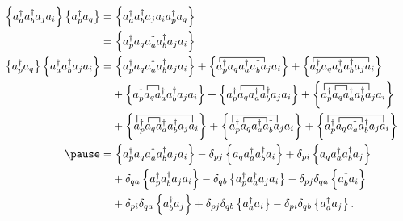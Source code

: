     \begin{align*}
        \normord{a^\dagger_a a^\dagger_b a_j a_i} \normord{a^\dagger_p a_q} &= 
            \normord{a^\dagger_a a^\dagger_b a_j a_i a^\dagger_p a_q} \\ 
        &= \normord{a^\dagger_p a_q a^\dagger_a a^\dagger_b a_j a_i} 
        \\
        \normord{a^\dagger_p a_q} \normord{a^\dagger_a a^\dagger_b a_j a_i} &= 
            \normord{a^\dagger_p a_q a^\dagger_a a^\dagger_b a_j a_i}
        + \left\{ 
        \contraction{}{a}{{}^\dagger_pa_q a^\dagger_a a^\dagger_b}{a}
        a^\dagger_p a_q a^\dagger_a a^\dagger_b a_j a_i\right\}
        + \left\{ 
        \contraction{}{a}{{}^\dagger_pa_q a^\dagger_a a^\dagger_b a_j}{a}
        a^\dagger_p a_q a^\dagger_a a^\dagger_b a_j a_i\right\} \\
        & \quad 
        + \left\{ 
        \contraction{a^\dagger_p}{a}{{}_q}{a}
        a^\dagger_p a_q a^\dagger_a a^\dagger_b a_j a_i\right\}
        + \left\{ 
        \contraction{a^\dagger_p}{a}{{}_q a^\dagger_a}{a}
        a^\dagger_p a_q a^\dagger_a a^\dagger_b a_j a_i\right\}
        + \left\{ 
        \contraction{a^\dagger_p}{a}{{}_q}{a}
        \contraction[1.5ex]{}{a}{{}^\dagger_pa_q a^\dagger_a a^\dagger_b}{a}
        a^\dagger_p a_q a^\dagger_a a^\dagger_b a_j a_i\right\} \\
        & \quad 
        + \left\{ 
        \contraction{a^\dagger_p}{a}{{}_q}{a}
        \contraction[1.5ex]{}{a}{{}^\dagger_pa_q a^\dagger_a a^\dagger_b a_j}{a}
        a^\dagger_p a_q a^\dagger_a a^\dagger_b a_j a_i\right\}
        + \left\{ 
        \contraction{a^\dagger_p}{a}{{}_q a^\dagger_a}{a}
        \contraction[1.5ex]{}{a}{{}^\dagger_pa_q a^\dagger_a a^\dagger_b}{a}
        a^\dagger_p a_q a^\dagger_a a^\dagger_b a_j a_i\right\}
        + \left\{ 
        \contraction{a^\dagger_p}{a}{{}_q a^\dagger_a}{a}
        \contraction[1.5ex]{}{a}{{}^\dagger_pa_q a^\dagger_a a^\dagger_b a_j}{a}
        a^\dagger_p a_q a^\dagger_a a^\dagger_b a_j a_i\right\} \\ \pause
        &= \normord{a^\dagger_p a_q a^\dagger_a a^\dagger_b a_j a_i}
        - \delta_{pj} \normord{a_q a^\dagger_a a^\dagger_b a_i}
        + \delta_{pi} \normord{a_q a^\dagger_a a^\dagger_b a_j} \\
        & \quad + \delta_{qa} \normord{a^\dagger_p a^\dagger_b a_j a_i}
        - \delta_{qb}\normord{a^\dagger_p a^\dagger_a a_j a_i} 
        - \delta_{pj} \delta_{qa} \normord{a^\dagger_b a_i} \\
        & \quad + \delta_{pi} \delta_{qa} \normord{a^\dagger_b a_j}
        + \delta_{pj} \delta_{qb} \normord{a^\dagger_a a_i}
        - \delta_{pi} \delta_{qb} \normord{a^\dagger_a a_j}.
    \end{align*}
